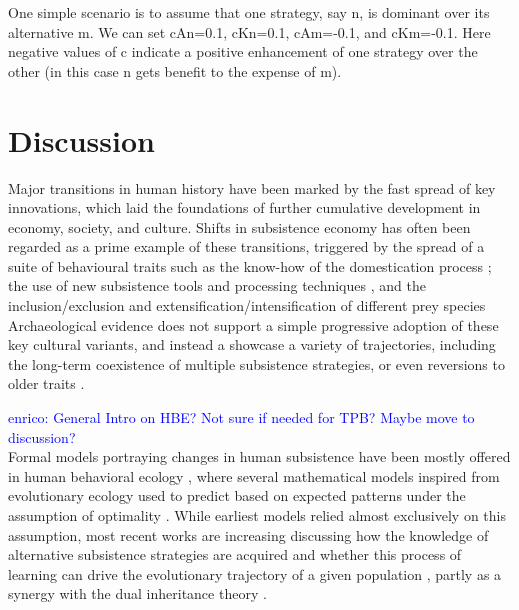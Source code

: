 \documentclass[preprint,authoryear]{elsarticle}
\newcommand{\memo}[2]{\textcolor{#1}{#2}}
\newcommand{\enrico}[1]{\memo{blue}{enrico: #1\\}}
\begin{document}
One simple scenario is to assume that one strategy, say n, is dominant over its alternative m. We can  set cAn=0.1,  cKn=0.1,  cAm=-0.1, and  cKm=-0.1. Here negative values of c indicate a positive enhancement of one strategy over the other (in this case n gets benefit to the expense of m). 

\section{Discussion}

Major transitions in human history have been marked by the fast spread of key innovations, which laid the foundations of further cumulative development in economy, society, and culture. Shifts in subsistence economy has often been regarded as a prime example of these transitions, triggered by the spread of a suite of behavioural traits such as the know-how of the domestication process \citep{barker2006}; the use of new subsistence tools %
and processing techniques \citep{molleson1993}, and the inclusion/exclusion and extensification/intensification of different prey species %
Archaeological evidence does  not support a simple progressive adoption of these key cultural variants, and instead a showcase a variety of trajectories, including the long-term coexistence of multiple subsistence strategies, or even reversions to older traits \citep{rowley2001}.  

\enrico{General Intro on HBE? Not sure if needed for TPB? Maybe move to discussion?}
Formal models portraying changes in human subsistence have been mostly offered in human behavioral ecology \citep{smith1992,bird2006,kennett2006}, where several mathematical models inspired from evolutionary ecology %
 used to predict  based on expected patterns under the assumption of optimality \citep{belovsky1988}. 
While earliest models relied almost exclusively on this assumption, most recent works are increasing discussing how the knowledge of alternative subsistence strategies are acquired %
and whether this process of learning can drive the evolutionary trajectory of a given population \citep{henrich1998}, partly as a synergy with the dual inheritance theory \citep{boyd1985}. 
\end{document}
